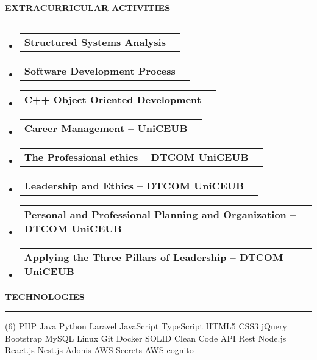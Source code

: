 \documentclass[a4paper,10pt]{article}
\makeatletter
\newcommand{\ProjectItem}[2]{
    \item
        \begin{tabular*}{0.93\textwidth}[t]{l@{\extracolsep{\fill}}r}
            \textbf{#1} & \footnotesize#2
        \end{tabular*}
}
\newcommand{\SectionTitle}[1]{
    \begin{flushleft}
    \textbf{#1}
    \noindent\textcolor{gray}{\rule{18.5cm}{1px}}
    \end{flushleft}
}
\newcommand{\SectionBegin}[0]{
    \vspace{-16pt}\begin{flushleft}
    \begin{itemize}
}
\newcommand{\SectionEnd}[0]{
    \end{itemize}
    \end{flushleft}\vspace{-2pt}
}
\makeatother
\begin{document}
\SectionTitle
{EXTRACURRICULAR ACTIVITIES}
\SectionBegin
\ProjectItem{Structured Systems Analysis}{}
\ProjectItem{Software Development Process}{}
\ProjectItem{C++ Object Oriented Development}{}
\ProjectItem{Career Management – UniCEUB}{}
\ProjectItem{The Professional ethics – DTCOM UniCEUB}{}
\ProjectItem{Leadership and Ethics – DTCOM UniCEUB}{}
\ProjectItem{Personal and Professional Planning and Organization – DTCOM UniCEUB}{}
\ProjectItem{Applying the Three Pillars of Leadership – DTCOM UniCEUB}{}
\SectionEnd

\SectionTitle
{TECHNOLOGIES}
\begin{tasks}[style=itemize, column-sep=-13mm, label-align=left, label-offset={0mm}](6)%
    \task PHP
    \task Java
    \task Python
    \task Laravel
    \task JavaScript
    \task TypeScript
    \task HTML5
    \task CSS3
    \task jQuery
    \task Bootstrap
    \task MySQL
    \task Linux
    \task Git
    \task Docker
    \task SOLID
    \task Clean Code
    \task API Rest
    \task Node.js
    \task React.js
    \task Nest.js
    \task Adonis
    \task AWS Secrets
    \task AWS cognito
\end{tasks}
\end{document}

